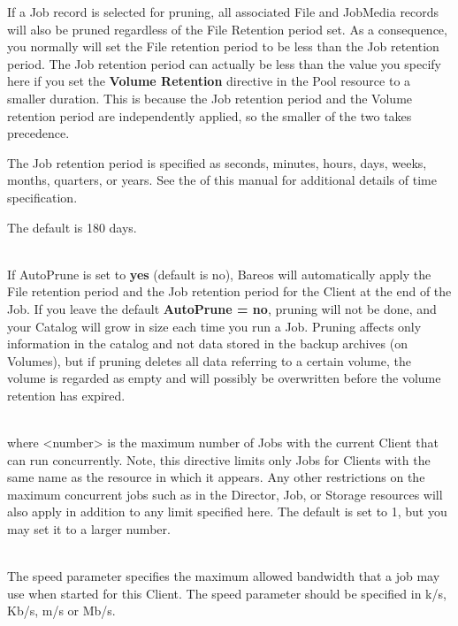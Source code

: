 \begin{description}
If a Job record is selected for pruning, all associated File and JobMedia
records will also be pruned regardless of the File Retention period set.
As a consequence, you normally will set the File retention period to be
less than the Job retention period.  The Job retention period can actually
be less than the value you specify here if you set the {\bf Volume
Retention} directive in the Pool resource to a smaller duration.  This is
because the Job retention period and the Volume retention period are
independently applied, so the smaller of the two takes precedence.

The Job retention period is specified as seconds,  minutes, hours, days,
weeks, months,  quarters, or years.  See the
 of this manual for
additional details of  time specification.

The default is 180 days.

\label{AutoPrune}
\item [AutoPrune = {\textless}yes{\textbar}no{\textgreater}] \hfill \\
If AutoPrune is set to  {\bf yes} (default is no), Bareos
will  automatically apply the File retention period and the Job  retention
period for the Client at the end of the Job.  If you leave the default {\bf AutoPrune = no},
pruning will not be done, and your Catalog will grow in size each time you
run a Job.  Pruning affects only information in the catalog and not data
stored in the backup archives (on Volumes), but if pruning deletes all data
referring to a certain volume, the volume is regarded as empty and will possibly
be overwritten before the volume retention has expired.

\item [Maximum Concurrent Jobs = {\textless}number{\textgreater}] \hfill \\
where {\textless}number{\textgreater}  is the maximum number of Jobs with the current Client
that  can run concurrently. Note, this directive limits only Jobs  for Clients
with the same name as the resource in which it appears. Any  other
restrictions on the maximum concurrent jobs such as in  the Director, Job, or
Storage resources will also apply in addition to  any limit specified here.
The  default is set to 1, but you may set it to a larger number.

\item [Maximum Bandwidth Per Job = {\textless}speed{\textgreater}] \hfill \\
The speed parameter specifies the maximum allowed bandwidth that a job may use
when started for this Client. The speed parameter should be specified in
k/s, Kb/s, m/s or Mb/s.


\end{description}
